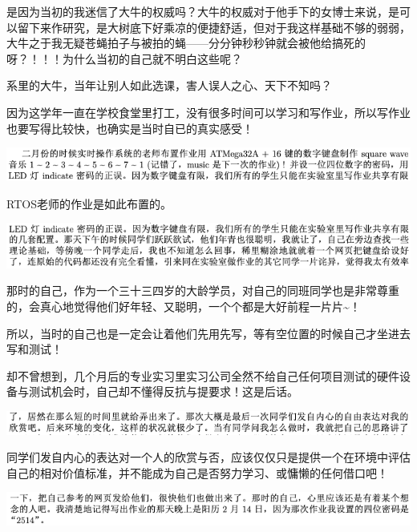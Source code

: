 \documentclass[9pt, b5paper]{article}
\begin{document}
是因为当初的我迷信了大牛的权威吗？大牛的权威对于他手下的女博士来说，是可以留下来作研究，是大树底下好乘凉的便捷舒适，但对于我这样基础不够的弱弱，大牛之于我无疑苍蝇拍子与被拍的蝇——分分钟秒秒钟就会被他给搞死的呀？！！！为什么当初的自己就不明白这些呢？

系里的大牛，当年让别人如此选课，害人误人之心、天下不知吗？

因为这学年一直在学校食堂里打工，没有很多时间可以学习和写作业，所以写作业也要写得比较快，也确实是当时自已的真实感受！

\begin{center}
\includegraphics[width=.9\linewidth]{./pic/backups_plans_20210502_115842.png}
\end{center}

RTOS老师的作业是如此布置的。

\begin{center}
\includegraphics[width=.9\linewidth]{./pic/backups_plans_20210502_115915.png}
\end{center}

那时的自己，作为一个三十三四岁的大龄学员，对自己的同班同学也是非常尊重的，会真心地觉得他们好年轻、又聪明，一个个都是大好前程一片片\textasciitilde{}！

所以，当时的自己也是一定会让着他们先用先写，等有空位置的时候自己才坐进去写和测试！

却不曾想到，几个月后的专业实习里实习公司全然不给自己任何项目测试的硬件设备与测试机会时，自己却不懂得反抗与提要求！这是后话。 

\begin{center}
\includegraphics[width=.9\linewidth]{./pic/backups_plans_20210502_120254.png}
\end{center}

同学们发自内心的表达对一个人的欣赏与否，应该仅仅只是提供一个在环境中评估自己的相对价值标准，并不能成为自己是否努力学习、或慵懒的任何借口吧！

\begin{center}
\includegraphics[width=.9\linewidth]{./pic/backups_plans_20210502_120523.png}
\end{center}
\end{document}

